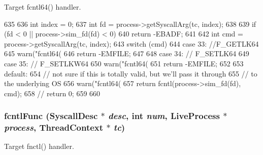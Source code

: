 Target fcntl64() handler. 


\begin{DoxyCode}
635 {
636     int index = 0;
637     int fd = process->getSyscallArg(tc, index);
638 
639     if (fd < 0 || process->sim_fd(fd) < 0)
640         return -EBADF;
641 
642     int cmd = process->getSyscallArg(tc, index);
643     switch (cmd) {
644       case 33: //F_GETLK64
645         warn("fcntl64(%
646         return -EMFILE;
647 
648       case 34: // F_SETLK64
649       case 35: // F_SETLKW64
650         warn("fcntl64(%
651         return -EMFILE;
652 
653       default:
654         // not sure if this is totally valid, but we'll pass it through
655         // to the underlying OS
656         warn("fcntl64(%
657         return fcntl(process->sim_fd(fd), cmd);
658         // return 0;
659     }
660 }
\end{DoxyCode}
\hypertarget{syscall__emul_8hh_a78ca4a2b9dba73eeb4fb283cc95a25e9}{
\subsubsection[{fcntlFunc}]{ fcntlFunc ({\bf SyscallDesc} $\ast$ {\em desc}, \/  int {\em num}, \/  {\bf LiveProcess} $\ast$ {\em process}, \/  {\bf ThreadContext} $\ast$ {\em tc})}}
\label{syscall__emul_8hh_a78ca4a2b9dba73eeb4fb283cc95a25e9}


Target fnctl() handler. 


